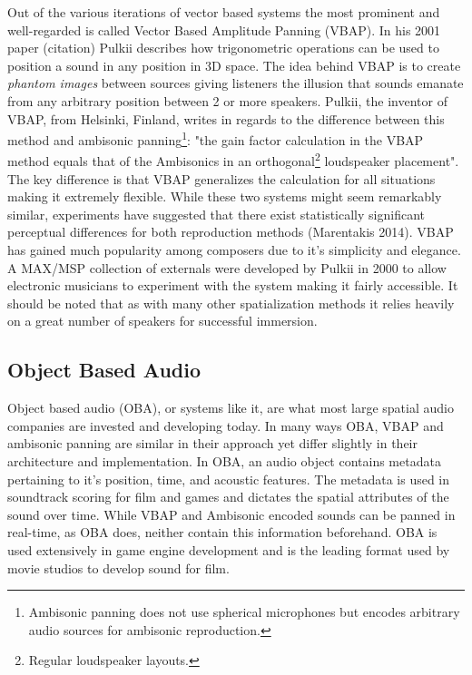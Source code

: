 Out of the various iterations of vector based systems the most prominent and well-regarded is called Vector Based Amplitude Panning (VBAP). In his 2001 paper (citation) Pulkii describes how trigonometric operations can be used to position a sound in any position in 3D space. The idea behind VBAP is to create \textit{phantom images} between sources giving listeners the illusion that sounds emanate from any arbitrary position between 2 or more speakers. Pulkii, the inventor of VBAP, from Helsinki, Finland, writes in regards to the difference between this method and ambisonic panning\footnote{Ambisonic panning does not use spherical microphones but encodes arbitrary audio sources for ambisonic reproduction.}: "the gain factor calculation in the VBAP method equals that of the Ambisonics in an orthogonal\footnote{Regular loudspeaker layouts.} loudspeaker placement". The key difference is that VBAP generalizes the calculation for all situations making it extremely flexible. While these two systems might seem remarkably similar, experiments have suggested that there exist statistically significant perceptual differences for both reproduction methods (Marentakis 2014). VBAP has gained much popularity among composers due to it's simplicity and elegance. A MAX/MSP collection of externals were developed by Pulkii in 2000 to allow electronic musicians to experiment with the system making it fairly accessible. It should be noted that as with many other spatialization methods it relies heavily on a great number of speakers for successful immersion. 

\subsection{Object Based Audio}
\label{subsec:oba}

Object based audio (OBA), or systems like it, are what most large spatial audio companies are invested and developing today. In many ways OBA, VBAP and ambisonic panning are similar in their approach yet differ slightly in their architecture and implementation. In OBA, an audio object contains metadata pertaining to it's position, time, and acoustic features. The metadata is used in soundtrack scoring for film and games and dictates the spatial attributes of the sound over time. While VBAP and Ambisonic encoded sounds can be panned in real-time, as OBA does, neither contain this information beforehand. OBA is used extensively in game engine development and is the leading format used by movie studios to develop sound for film. 

